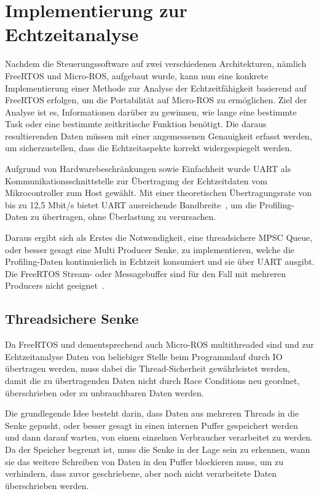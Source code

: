 \section{Implementierung zur Echtzeitanalyse}

Nachdem die Steuerungssoftware auf zwei verschiedenen Architekturen, nämlich
FreeRTOS und Micro-ROS, aufgebaut wurde, kann nun eine konkrete Implementierung
einer Methode zur Analyse der Echtzeitfähigkeit basierend auf FreeRTOS erfolgen,
um die Portabilität auf Micro-ROS zu ermöglichen. Ziel der Analyse ist es,
Informationen darüber zu gewinnen, wie lange eine bestimmte Task oder eine
bestimmte zeitkritische Funktion benötigt. Die daraus resultierenden Daten
müssen mit einer angemessenen Genauigkeit erfasst werden, um sicherzustellen,
dass die Echtzeitaspekte korrekt widergespiegelt werden.

Aufgrund von Hardwarebeschränkungen sowie Einfachheit wurde UART als
Kommunikationsschnittstelle zur Übertragung der Echtzeitdaten vom
Mikrocontroller zum Host gewählt. Mit einer theoretischen Übertragungsrate von
bis zu 12,5 Mbit/s bietet UART ausreichende Bandbreite~\cite[S.
2]{stm32_datasheet}, um die Profiling-Daten zu übertragen, ohne Überlastung zu
verursachen.

Daraus ergibt sich als Erstes die Notwendigkeit, eine threadsichere \ac{MPSC}
Queue, oder besser gesagt eine Multi Producer Senke, zu implementieren, welche
die Profiling-Daten kontinuierlich in Echtzeit konsumiert und sie über UART
ausgibt. Die FreeRTOS Stream- oder Messagebuffer sind für den Fall mit mehreren
Producers nicht geeignet~\cite{FreeRTOSStreamBuffer}.

\subsection{Threadsichere Senke}

Da FreeRTOS und dementsprechend auch Micro-ROS multithreaded sind und zur
Echtzeitanalyse Daten von beliebiger Stelle beim Programmlauf durch IO
übertragen werden, muss dabei die Thread-Sicherheit gewährleistet werden, damit
die zu übertragenden Daten nicht durch Race Conditions neu geordnet,
überschrieben oder zu unbrauchbaren Daten werden.

Die grundlegende Idee besteht darin, dass Daten aus mehreren Threads in die
Senke gepusht, oder besser gesagt in einen internen Puffer gespeichert werden
und dann darauf warten, von einem einzelnen Verbraucher verarbeitet zu werden.
Da der Speicher begrenzt ist, muss die Senke in der Lage sein zu erkennen, wann
sie das weitere Schreiben von Daten in den Puffer blockieren muss, um zu
verhindern, dass zuvor geschriebene, aber noch nicht verarbeitete Daten
überschrieben werden.

